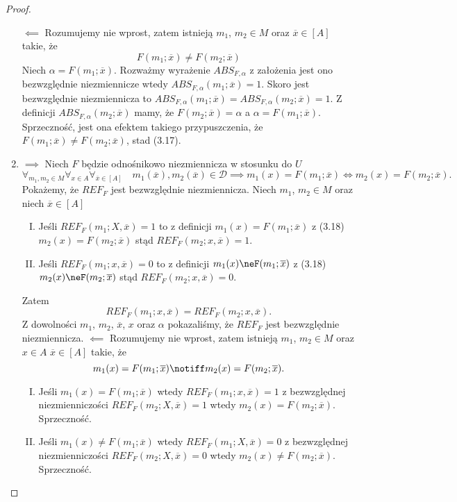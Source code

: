 \documentclass[12pt,a4paper]{report}
\newcommand{\domkniecie}[1]{\left\lbrack{#1}\right\rbrack}
\begin{document}
\begin{proof}
\begin{enumerate}
$\impliedby$
Rozumujemy nie wprost, zatem istnieją $m_1$, $m_2 \in M$ oraz $\overline{x} \in \domkniecie{A}$ takie, że
$$
F(m_1;\overline{x})\ne F(m_2;\overline{x})
$$
Niech $\alpha=F(m_1;\overline{x})$. Rozważmy wyrażenie $ABS_{F,\alpha}$  z założenia jest ono bezwzględnie niezmiennicze wtedy $ABS_{F,\alpha}(m_1;\overline{x})=1$. Skoro jest bezwzględnie niezmiennicza  to $ABS_{F,\alpha}(m_1;\overline{x})=ABS_{F,\alpha}(m_2;\overline{x})=1$. Z definicji $ABS_{F,\alpha}(m_2;\overline{x})$ mamy, że $F(m_2;\overline{x})=\alpha$ a $\alpha=F(m_1;\overline{x})$. Sprzeczność, jest ona efektem takiego przypuszczenia, że $F(m_1;\overline{x})\ne F(m_2;\overline{x})$, stad (3.17).
\item
$\implies$
Niech $F$ będzie odnośnikowo niezmiennicza w stosunku do $U$ 
\begin{equation}
\forall_{m_{1}, m_{2} \in M} \forall_{x \in A} \forall_{\overline{x} \in \domkniecie{A}} \quad m_1(\overline{x}), m_2(\overline{x})\in \mathcal{D} \implies  m_{1}(x)=F(m_{1};\overline{x}) \iff m_{2}(x)=F(m_{2};\overline{x}).
\end{equation}
Pokażemy, że $REF_{F}$ jest bezwzględnie niezmiennicza. Niech $m_1$, $m_2 \in M$ oraz niech $\overline{x} \in \domkniecie{A}$ 
\begin{enumerate}[I.]
\item
Jeśli $REF_{F}(m_1;X,\overline{x})=1$ to z definicji $m_1(x)=F(m_1;\overline{x})$ z (3.18) $m_2(x)=F(m_2;\overline{x})$ stąd $REF_{F}(m_2;x,\overline{x})=1$.
\item
Jeśli $REF_{F}(m_1;x,\overline{x})=0$ to z definicji $m_1(x)\neF(m_1;\overline{x})$ z (3.18) $m_2(x)\neF(m_2;\overline{x})$ stąd $REF_{F}(m_2;x,\overline{x})=0$.
\end{enumerate}
Zatem 
$$
REF_{F}(m_1;x,\overline{x})=REF_{F}(m_2;x,\overline{x}).
$$
Z dowolności $m_1$, $m_2$, $\overline{x}$, $x$ oraz $\alpha$ pokazaliśmy, że $REF_{F}$ jest bezwzględnie niezmiennicza.
$\impliedby$
Rozumujemy nie wprost, zatem istnieją $m_1$, $m_2 \in M$ oraz$x\in A$ $\overline{x} \in \domkniecie{A}$ takie, że
$$
m_{1}(x)=F(m_{1};\overline{x}) \notiff m_{2}(x)=F(m_{2};\overline{x}).
$$
\begin{enumerate}[I.]
\item
Jeśli $m_1(x)=F(m_1;\overline{x})$ wtedy $REF_{F}(m_1;x,\overline{x})=1$ z bezwzględnej niezmienniczości $REF_{F}(m_2;X,\overline{x})=1$ wtedy $m_2(x)=F(m_2;\overline{x})$. Sprzeczność.
\item
Jeśli $m_1(x)\ne F(m_1;\overline{x})$ wtedy $REF_{F}(m_1;X,\overline{x})=0$ z bezwzględnej niezmienniczości $REF_{F}(m_2;X,\overline{x})=0$ wtedy $m_2(x)\ne F(m_2;\overline{x})$. Sprzeczność.

\end{enumerate}
\end{enumerate}
\end{proof}
\end{document}
